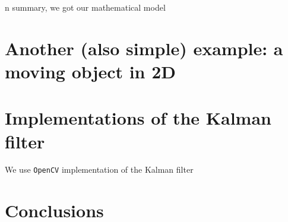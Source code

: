 \documentclass[12pt,a4paper,final]{article} %
\begin{document}
n summary, we got our mathematical model

\section{Another (also simple) example: a moving object in 2D}
\label{sec:example2D}


\section{Implementations of the Kalman filter}
We use \texttt{OpenCV} \cite{opencv:2000:ARTICLE} implementation of
the Kalman filter

\section{Conclusions}

\printbibliography[heading=bibintoc]
\end{document}
